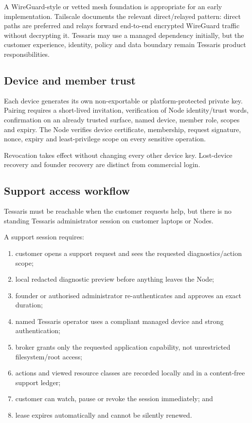 \documentclass[11pt]{article}
\begin{document}
A WireGuard-style or vetted mesh foundation is appropriate for an early implementation. Tailscale documents the relevant direct/relayed pattern: direct paths are preferred and relays forward end-to-end encrypted WireGuard traffic without decrypting it. Tessaris may use a managed dependency initially, but the customer experience, identity, policy and data boundary remain Tessaris product responsibilities.

\subsection{Device and member trust}

Each device generates its own non-exportable or platform-protected private key. Pairing requires a short-lived invitation, verification of Node identity/trust words, confirmation on an already trusted surface, named device, member role, scopes and expiry. The Node verifies device certificate, membership, request signature, nonce, expiry and least-privilege scope on every sensitive operation.

Revocation takes effect without changing every other device key. Lost-device recovery and founder recovery are distinct from commercial login.

\subsection{Support access workflow}

Tessaris must be reachable when the customer requests help, but there is no standing Tessaris administrator session on customer laptops or Nodes.

A support session requires:

\begin{enumerate}
  \item customer opens a support request and sees the requested diagnostics/action scope;
  \item local redacted diagnostic preview before anything leaves the Node;
  \item founder or authorised administrator re-authenticates and approves an exact duration;
  \item named Tessaris operator uses a compliant managed device and strong authentication;
  \item broker grants only the requested application capability, not unrestricted filesystem/root access;
  \item actions and viewed resource classes are recorded locally and in a content-free support ledger;
  \item customer can watch, pause or revoke the session immediately; and
  \item lease expires automatically and cannot be silently renewed.
\end{enumerate}
\end{document}
